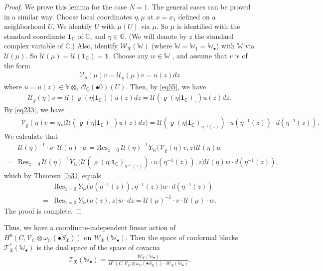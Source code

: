 \documentclass[12pt,a4paper,notitlepage]{report}
\theoremstyle{definition}
\theoremstyle{plain}
\newcommand{\fk}{\mathfrak}
\newcommand{\mc}{\mathcal}
\newcommand{\id}{\mathbf{1}}
\newcommand{\Res}{\mathrm{Res}}
\newcommand{\scr}{\mathscr}
\newcommand{\blt}{\bullet}
\newcommand{\Vbb}{\mathbb V}
\newcommand{\Wbb}{\mathbb W}
\newcommand{\Gbb}{\mathbb G}
\newcommand{\Cbb}{\mathbb C}
\numberwithin{equation}{section}
\begin{document}
\begin{proof}
We prove this lemma for the case $N=1$. The general cases can be proved in a similar way. Choose local coordinates $\eta,\mu$ at $x=x_1$ defined on a neighborhood $U$. We identify $U$ with $\mu(U)$ via $\mu$. So $\mu$  is identified with the standard coordinate $\id_\Cbb$ of $\Cbb$, and $\eta\in\Gbb$. (We will denote by $z$ the standard complex variable of $\Cbb$.) Also, identify $\scr W_{\fk X}(\Wbb)$ (where $\Wbb=\Wbb_1=\Wbb_\blt$) with $\Wbb$ via $\mc U(\mu)$. So $\mc U(\mu)=\mc U(\id_\Cbb)=\id$.  Choose any $w\in\Wbb$ , and assume that $v$ is of the form
\begin{gather*}
\mc V_\varrho(\mu)v=\mc U_\varrho(\mu)v=u(z)dz
\end{gather*}
where $u=u(z)\in\Vbb\otimes_\Cbb\scr O_\Cbb(\blt 0)(U)$. Then, by \eqref{eq55}, we have
\begin{gather*}
\mc U_\varrho(\eta)v=\mc U(\varrho(\eta|\id_\Cbb))u(z)dz=\mc U(\varrho(\eta|\id_\Cbb)_z)u(z)dz.
\end{gather*}
By \eqref{eq233}, we have
\begin{gather*}
\qquad \mc V_\varrho(\eta)v=\eta_*\big(\mc U(\varrho(\eta|\id_\Cbb)_z)u(z)dz \big)=\mc U(\varrho(\eta|\id_\Cbb)_{\eta^{-1}(z)})\cdot u(\eta^{-1}(z))\cdot d(\eta^{-1}(z)).
\end{gather*}
We calculate that
\begin{align*}
&\mc U(\eta)^{-1}\cdot v\cdot\mc U(\eta)\cdot w=\Res_{z=0}~\mc U(\eta)^{-1}Y_\Wbb\big(\mc V_\varrho(\eta)v,z\big)\mc U(\eta)w\\
=&\Res_{z=0}~\mc U(\eta)^{-1}Y_\Wbb\big(\mc U(\varrho(\eta|\id_\Cbb)_{\eta^{-1}(z)})\cdot u(\eta^{-1}(z)),z\big)\mc U(\eta)w\cdot d(\eta^{-1}(z)),
\end{align*}
which by Theorem \ref{lb31} equals
\begin{align*}
&\Res_{z=0}~Y_\Wbb\big( u(\eta^{-1}(z)),\eta^{-1}(z)\big)w\cdot d(\eta^{-1}(z))\\
=&\Res_{z=0}~Y_\Wbb\big( u(z),z\big)w\cdot dz=\mc U(\mu)^{-1}\cdot v\cdot\mc U(\mu)\cdot w.
\end{align*}
The proof is complete.
\end{proof}







Thus, we have a coordinate-independent linear action of $H^0(C,\scr V_C\otimes\omega_C(\blt S_{\fk X}))$ on $\scr W_{\fk X}(\Wbb_\blt)$. Then the space of conformal blocks $\scr T_{\fk X}^*(\Wbb_\blt)$ \index{T@$\scr T_{\fk X}(\Wbb_\blt),\scr T_{\fk X}^*(\Wbb_\blt)$} is the dual space of the space of covacua
\begin{gather}
\scr T_{\fk X}(\Wbb_\blt)=\frac{\scr W_{\fk X}(\Wbb_\blt)}{H^0(C,\scr V_C\otimes\omega_C(\blt S_{\fk X}))\cdot \scr W_{\fk X}(\Wbb_\blt)}.
\end{gather}
\end{document}
